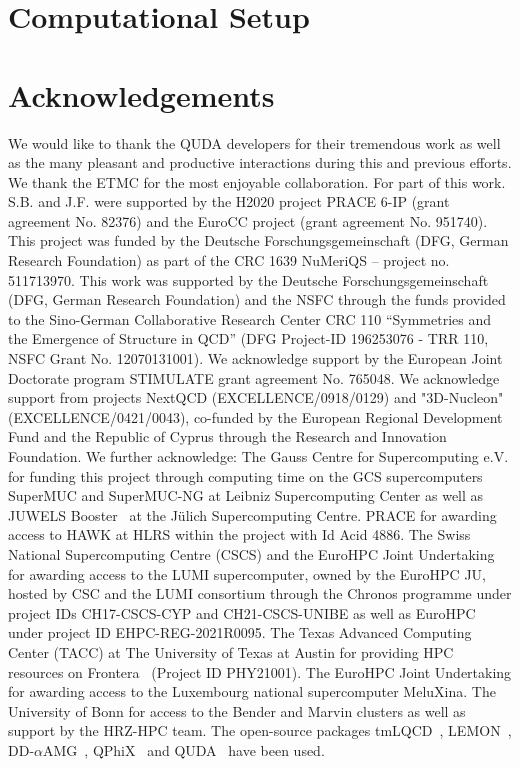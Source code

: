 \documentclass[a4paper,11pt]{article}
\begin{document}
\section{Computational Setup}


\section{Acknowledgements}
{
\small
We would like to thank the QUDA developers for their tremendous work as well as the many pleasant and productive interactions during this and previous efforts. 
We thank the ETMC for the most enjoyable collaboration. 
For part of this work. S.B. and J.F. were supported by the H2020 project PRACE 6-IP (grant agreement No. 82376) and the EuroCC project (grant agreement No. 951740).
This project was funded by the Deutsche Forschungsgemeinschaft (DFG, German Research Foundation) as part of the CRC 1639 NuMeriQS – project no. 511713970. 
This work was supported by the Deutsche Forschungsgemeinschaft (DFG, German Research Foundation) and the NSFC through the funds provided to the Sino-German Collaborative Research Center CRC 110 “Symmetries and the Emergence of Structure in QCD” (DFG Project-ID 196253076 - TRR 110, NSFC Grant No. 12070131001).
We acknowledge support by the European Joint Doctorate program STIMULATE grant agreement No. 765048.
We acknowledge support from projects NextQCD (EXCELLENCE/0918/0129) and "3D-Nucleon" (EXCELLENCE/0421/0043), co-funded by the European Regional Development Fund and the Republic of Cyprus through the Research and Innovation Foundation. 
We further acknowledge: The Gauss Centre for Supercomputing e.V. for funding this project through computing time on the GCS supercomputers SuperMUC and SuperMUC-NG at Leibniz Supercomputing Center as well as JUWELS Booster~\cite{JUWELS,BOOSTER} at the Jülich Supercomputing Centre.
PRACE for awarding access to HAWK at HLRS within the project with Id Acid 4886. 
The Swiss National Supercomputing Centre (CSCS) and the EuroHPC Joint Undertaking for awarding access to the LUMI supercomputer, owned by the EuroHPC JU, hosted by CSC and the LUMI consortium through the Chronos programme under project IDs CH17-CSCS-CYP and CH21-CSCS-UNIBE as well as EuroHPC under project ID EHPC-REG-2021R0095.
The Texas Advanced Computing Center (TACC) at The University of Texas at Austin for providing HPC resources on Frontera~\cite{FRONTERA} (Project ID PHY21001).
The EuroHPC Joint Undertaking for awarding access to the Luxembourg national supercomputer MeluXina.
The University of Bonn for access to the Bender and Marvin clusters as well as support by the HRZ-HPC team.
The open-source packages tmLQCD~\cite{Jansen:2009xp,Abdel-Rehim:2013wba,Deuzeman:2013xaa,Kostrzewa:2022hsv,tmLQCD_mg_tune}, LEMON~\cite{Deuzeman:2011wz}, DD-$\alpha$AMG~\cite{Frommer:2013fsa,Alexandrou:2016izb,Bacchio:2017pcp,Alexandrou:2018wiv}, QPhiX~\cite{qphix13,qphix14,qphix16,Schrock:2015gik} and QUDA~\cite{Clark:2009wm,Babich:2011np,Clark:2016rdz} have been used.
}


{\footnotesize

}
\end{document}
